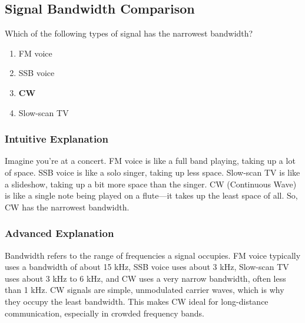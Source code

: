 \subsection{Signal Bandwidth Comparison}
\label{T8A05}

\begin{tcolorbox}[colback=gray!10!white,colframe=black!75!black,title=T8A05]
Which of the following types of signal has the narrowest bandwidth?
\begin{enumerate}[noitemsep]
    \item FM voice
    \item SSB voice
    \item \textbf{CW}
    \item Slow-scan TV
\end{enumerate}
\end{tcolorbox}

\subsubsection*{Intuitive Explanation}
Imagine you're at a concert. FM voice is like a full band playing, taking up a lot of space. SSB voice is like a solo singer, taking up less space. Slow-scan TV is like a slideshow, taking up a bit more space than the singer. CW (Continuous Wave) is like a single note being played on a flute—it takes up the least space of all. So, CW has the narrowest bandwidth.

\subsubsection*{Advanced Explanation}
Bandwidth refers to the range of frequencies a signal occupies. FM voice typically uses a bandwidth of about 15 kHz, SSB voice uses about 3 kHz, Slow-scan TV uses about 3 kHz to 6 kHz, and CW uses a very narrow bandwidth, often less than 1 kHz. CW signals are simple, unmodulated carrier waves, which is why they occupy the least bandwidth. This makes CW ideal for long-distance communication, especially in crowded frequency bands.